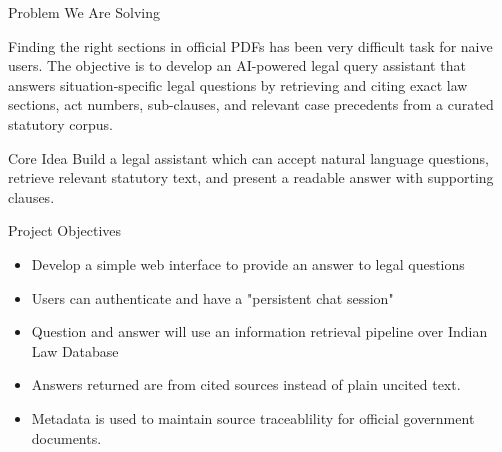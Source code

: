 \documentclass[aspectratio=169]{beamer}
\begin{document}
\begin{frame}{Problem We Are Solving}
  \justifying

  Finding the right sections in official PDFs has been very difficult task for naive users. The objective is to develop an AI-powered legal query assistant that answers situation-specific
legal questions by retrieving and citing exact law sections, act numbers, sub-clauses, and relevant case precedents from a curated statutory corpus.

  \vspace{0.5em}
  \begin{block}{Core Idea}
    Build a legal assistant which can accept natural language questions, retrieve relevant statutory text, and present a readable answer with supporting clauses.
  \end{block}
\end{frame}

\begin{frame}{Project Objectives}
  \begin{itemize}
    \item Develop a simple web interface to provide an answer to legal questions
    \item Users can authenticate and have a "persistent chat session"
    \item Question and answer will use an information retrieval pipeline over Indian Law Database
    \item Answers returned are from cited sources instead of plain uncited text.
    \item Metadata is used to maintain source traceablility for official government documents.
  \end{itemize}
\end{frame}
\end{document}
